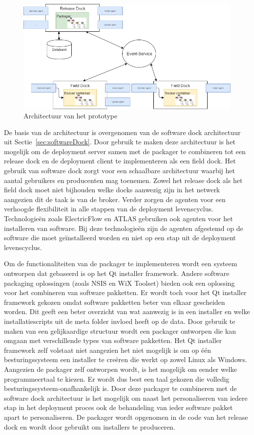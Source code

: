 \begin{figure}
\includegraphics[width=\textwidth,height=\textheight,keepaspectratio]{afbeelding/architectuur.png}
\centering
\caption{Architectuur van het prototype}
\label{fig:architectuur}
\end{figure}

De basis van de architectuur is overgenomen van de software dock architectuur uit Sectie~\ref{sec:softwareDock}.
Door gebruik te maken deze architectuur is het mogelijk om de deployment server samen met de packager te combineren tot een release dock en de deployment client te implementeren als een field dock. 
Het gebruik van software dock zorgt voor een schaalbare architectuur waarbij het aantal gebruikers en producenten mag toenemen.
Zowel het release dock als het field dock moet niet bijhouden welke docks aanwezig zijn in het netwerk aangezien dit de taak is van de broker.
Verder zorgen de agenten voor een verhoogde flexibiliteit in alle stappen van de deployment levenscyclus.
Technologieën zoals ElectricFlow en ATLAS gebruiken ook agenten voor het installeren van software.
Bij deze technologieën zijn de agenten afgestemd op de software die moet geïnstalleerd worden en niet op een stap uit de deployment levenscyclus.

Om de functionaliteiten van de packager te implementeren wordt een systeem ontworpen dat gebaseerd is op het Qt installer framework.
Andere software packaging oplossingen (zoals NSIS en WiX Toolset) bieden ook een oplossing voor het combineren van software pakketten.
Er wordt toch voor het Qt installer framework gekozen omdat software pakketten beter van elkaar gescheiden worden.
Dit geeft een beter overzicht van wat aanwezig is in een installer en welke installatiescripts uit de meta folder invloed heeft op de data.
Door gebruik te maken van een gelijkaardige structuur wordt een packager ontworpen die kan omgaan met verschillende types van software pakketten.
Het Qt installer framework zelf volstaat niet aangezien het niet mogelijk is om op één besturingssysteem een installer te creëren die werkt op zowel Linux als Windows.
Aangezien de packager zelf ontworpen wordt, is het mogelijk om eender welke programmeertaal te kiezen.
Er wordt dus best een taal gekozen die volledig besturingssysteem-onafhankelijk is.
Door deze packager te combineren met de software dock architectuur is het mogelijk om naast het personaliseren van iedere stap in het deployment proces ook de behandeling van ieder software pakket apart te personaliseren.
De packager wordt opgenomen in de code van het release dock en wordt door gebruikt om installers te produceren.

